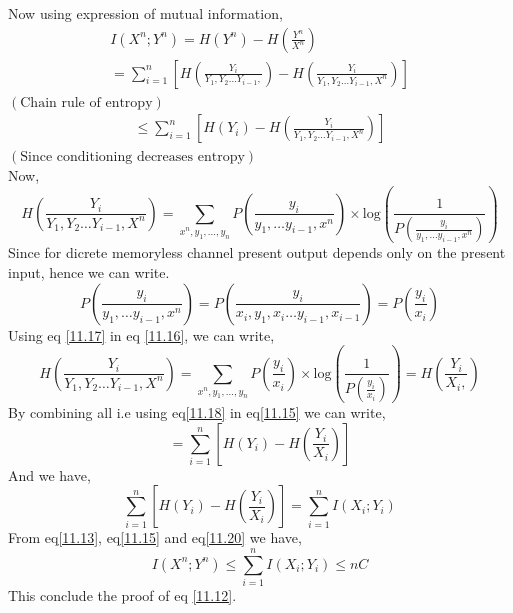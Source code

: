 \documentclass{article}
\begin{document}
 Now using expression of mutual information,
 \begin{gather}
 	I\left( X^n; Y^n\right) = H \left( Y^n\right) - H \left( \frac{Y^n}{X^n}\right) \label{11.13}\\
 = \sum_{i =1}^{n} \left[ H \left( \frac{Y_i}{Y_1, Y_2 \dots Y_{i-1},}\right) - H \left( \frac{Y_i}{Y_1, Y_2 \dots Y_{i-1}, X^n} \right)\right] \label{11.14}
 \end{gather}
 	\hspace{10cm} $\left( \text{Chain rule of entropy}\right)$	
 	\begin{gather}
 	\leq \sum_{i=1}^{n} \left[ H\left( Y_i\right) - H\left( \frac{Y_i}{Y_1, Y_2 \dots Y_{i-1}, X^n} \right) \right] \label{11.15}
 	\end{gather}
 	\hspace{10cm} $\left( \text{Since conditioning decreases  entropy}\right)$\\ 
 Now,
 \begin{equation}
 H \left( \frac{Y_i}{Y_1, Y_2 \dots Y_{i-1}, X^n} \right)   =  \sum_{x^n, y_1, \dots , y_n} P\left( \frac{y_i}{y_1, \dots y_{i-1}, x^n}\right) \times \text{log}\left(  \frac{1}{ P\left( \frac{y_i}{ y_1, \dots y_{i-1}, x^n } \right)}  \right) \label{11.16}
 \end{equation}
 	Since for dicrete memoryless channel present output depends only on the present input, hence we can write.
 	\begin{equation}	
 P\left( \frac{y_i}{y_1, \dots y_{i-1}, x^n}\right) =   P\left( \frac{y_i}{x_i, y_1,x_i \dots y_{i-1},x_{i-1} }\right) =  P\left( \frac{y_i}{ x_i}\right) \label{11.17}
 \end{equation}
Using eq \ref{11.17} in eq \ref{11.16}, we can write,
 	\begin{equation}
  H \left( \frac{Y_i}{Y_1, Y_2 \dots Y_{i-1}, X^n} \right) =  \sum_{x^n, y_1, \dots , y_n} P\left( \frac{y_i}{x_i}\right) \times \text{log}\left(  \frac{1}{ P\left( \frac{y_i}{ x_i } \right)}  \right) = 	H\left( \frac{Y_i}{X_i, } \right) \label{11.18}	
 \end{equation}
  By combining all i.e using eq\ref{11.18} in eq\ref{11.15} we can write,
  \begin{equation}
  = \sum_{i=1}^{n} \left[ H\left( Y_i\right) - H\left( \frac{Y_i}{ X_i} \right) \right]
  \end{equation}
 And we have,
 \begin{equation}
 	 \sum_{i=1}^{n} \left[ H\left( Y_i\right) - H\left( \frac{Y_i}{ X_i} \right) \right] = \sum_{i=1}^{n} I \left( {X_i ; Y_i} \right) \label{11.20}
 \end{equation}
From  eq\ref{11.13}, eq\ref{11.15} and eq\ref{11.20} we have,
\begin{equation}
	I \left( X^n ; Y^n\right) \leq \sum_{i=1}^{n} I \left( {X_i ; Y_i} \right) \leq nC \label{11.21}
\end{equation}
This conclude the proof of eq \ref{11.12}. \\
\end{document}
